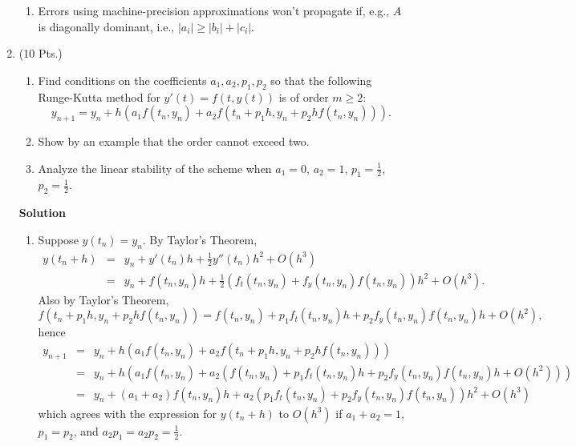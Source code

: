 \documentclass{article}
\begin{document}
\begin{enumerate}
\begin{enumerate}
\item Errors using machine-precision approximations won't propagate if, e.g., \(A\) is diagonally dominant, i.e., \(|a_i| \geq |b_i| + |c_i|\).

\end{enumerate}



\item (10 Pts.)

\begin{enumerate}
\item Find conditions on the coefficients \(a_1,a_2,p_1,p_2\) so that the following Runge-Kutta method for \(y'(t) = f(t,y(t))\) is of order \(m \geq 2\):
\[y_{n + 1} = y_n + h \left( a_1 f(t_n,y_n) + a_2 f(t_n + p_1 h, y_n + p_2 h f(t_n,y_n)) \right).\]

\item Show by an example that the order cannot exceed two.

\item Analyze the linear stability of the scheme when \(a_1 = 0\), \(a_2 = 1\), \(p_1 = \frac{1}{2}\), \(p_2 = \frac{1}{2}\).

\end{enumerate}

{\bf Solution}

\begin{enumerate}
\item Suppose \(y(t_n) = y_n\).  By Taylor's Theorem,
\begin{eqnarray*}
y(t_n + h) & = & y_n + y'(t_n) h + \frac{1}{2} y''(t_n) h^2 + O(h^3) \\
           & = & y_n + f(t_n,y_n) h + \frac{1}{2} \left( f_t(t_n,y_n) + f_y(t_n,y_n) f(t_n,y_n) \right) h^2 + O(h^3).
\end{eqnarray*}
Also by Taylor's Theorem,
\[f(t_n + p_1h, y_n + p_2 h f(t_n,y_n))
  = f(t_n,y_n) + p_1 f_t(t_n,y_n) h + p_2 f_y(t_n,y_n) f(t_n,y_n) h + O(h^2),\]
hence
\begin{eqnarray*}
y_{n + 1} & = & y_n + h \left( a_1 f(t_n,y_n) + a_2 f(t_n + p_1 h, y_n + p_2 h f(t_n,y_n)) \right) \\
          & = & y_n + h \left( a_1 f(t_n,y_n) + a_2 \left( f(t_n,y_n) + p_1 f_t(t_n,y_n) h + p_2 f_y(t_n,y_n) f(t_n,y_n) h  + O(h^2) \right) \right) \\
          & = & y_n + (a_1 + a_2) f(t_n,y_n) h + a_2 \left( p_1 f_t(t_n,y_n) + p_2 f_y(t_n,y_n) f(t_n,y_n) \right) h^2 + O(h^3)
\end{eqnarray*}
which agrees with the expression for \(y(t_n + h)\) to \(O(h^3)\) if \(a_1 + a_2 = 1\), \(p_1 = p_2\), and \(a_2 p_1 = a_2 p_2 = \frac{1}{2}\).


\end{enumerate}
\end{enumerate}
\end{document}
